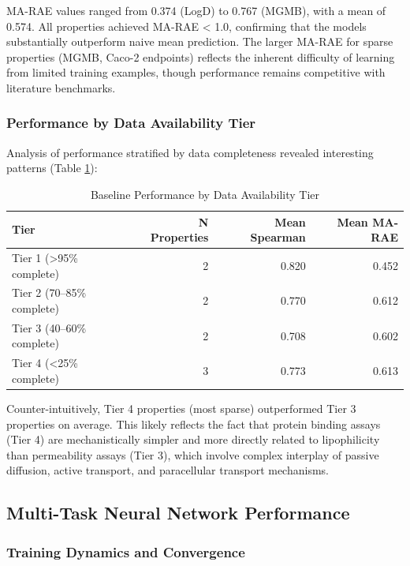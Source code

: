 \documentclass[11pt,a4paper]{article}
\begin{document}
MA-RAE values ranged from 0.374 (LogD) to 0.767 (MGMB), with a mean of 0.574. All properties achieved MA-RAE < 1.0, confirming that the models substantially outperform naive mean prediction. The larger MA-RAE for sparse properties (MGMB, Caco-2 endpoints) reflects the inherent difficulty of learning from limited training examples, though performance remains competitive with literature benchmarks.

\subsubsection{Performance by Data Availability Tier}

Analysis of performance stratified by data completeness revealed interesting patterns (Table \ref{tab:tier_analysis}):

\begin{table}[h]
\centering
\caption{Baseline Performance by Data Availability Tier}
\label{tab:tier_analysis}
\begin{tabular}{lrrr}
\toprule
Tier & N Properties & Mean Spearman & Mean MA-RAE \\
\midrule
Tier 1 (>95\% complete) & 2 & 0.820 & 0.452 \\
Tier 2 (70--85\% complete) & 2 & 0.770 & 0.612 \\
Tier 3 (40--60\% complete) & 2 & 0.708 & 0.602 \\
Tier 4 (<25\% complete) & 3 & 0.773 & 0.613 \\
\bottomrule
\end{tabular}
\end{table}

Counter-intuitively, Tier 4 properties (most sparse) outperformed Tier 3 properties on average. This likely reflects the fact that protein binding assays (Tier 4) are mechanistically simpler and more directly related to lipophilicity than permeability assays (Tier 3), which involve complex interplay of passive diffusion, active transport, and paracellular transport mechanisms.

\subsection{Multi-Task Neural Network Performance}

\subsubsection{Training Dynamics and Convergence}
\end{document}
